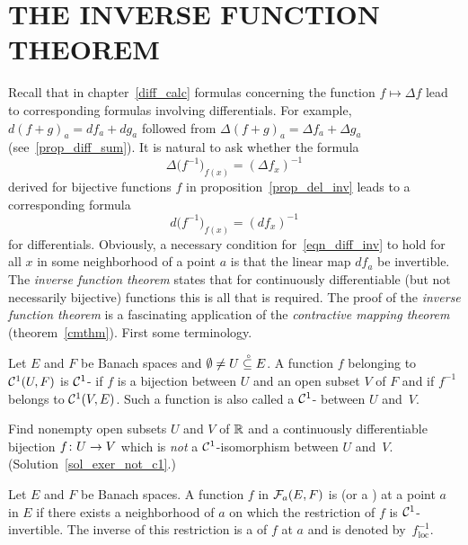 \section{THE INVERSE FUNCTION THEOREM} Recall that in chapter~\ref{diff_calc} formulas concerning
the function $f \mapsto \Delta f$ lead to corresponding formulas involving differentials. For
example, $d(f+g)_a = df_a + dg_a$ followed from $\Delta (f+g)_a = \Delta f_a + \Delta g_a$
(see~\ref{prop_diff_sum}).  It is natural to ask whether the formula
  \[ \Delta \bigl(f^{-1}\bigr)_{f(x)} = (\Delta f_x)^{-1} \]
derived for bijective functions $f$ in proposition~\ref{prop_del_inv} leads to a corresponding
formula
 \begin{equation}\label{eqn_diff_inv}
     d\bigl(f^{-1}\bigr)_{f(x)} = (df_x)^{-1}
 \end{equation}
for differentials.  Obviously, a necessary condition for~\eqref{eqn_diff_inv} to hold for all
$x$ in some neighborhood of a point $a$ is that the linear map $df_a$ be invertible.  The
\emph{inverse function theorem} states that for continuously differentiable (but not
necessarily bijective) functions this is all that is required.  The proof of the \emph{inverse
function theorem} is a fascinating application of the \emph{contractive mapping theorem}
(theorem~\ref{cmthm}).  First some terminology.

\begin{defn}  Let $E$ and $F$ be Banach spaces and $\emptyset \ne U\overset{\thickspace{}_\circ}{\subseteq}E$.  A function $f$
belonging to  $\mathcal{C}^1(U,F)$  is
$\mathcal{C}^1$- if $f$ is a bijection between $U$ and an open subset $V$ of $F$ and
if $f^{-1}$ belongs to $\mathcal{C}^1(V,E)$.  Such a function is also called a
$\mathcal{C}^1$- between $U$ and~$V$.
\end{defn}

\begin{exer}\label{exer_not_c1}  Find nonempty open subsets $U$ and $V$ of $\mathbb{R}$ and a
continuously differentiable bijection $f \colon U \rightarrow V$ which is \emph{not} a $\mathcal{C}^1$-isomorphism between $U$ and~$V$. (Solution~\ref{sol_exer_not_c1}.)
\end{exer}

\begin{defn}  Let $E$ and $F$ be Banach spaces.  A function $f$ in $\mathcal{F}_a(E,F)$ is
 (or a
) at a point $a$ in $E$ if there exists a neighborhood of $a$
on which the restriction of $f$ is $\mathcal{C}^1$-invertible.  The inverse of this restriction is
a
 of $f$ at $a$ and is denoted
by~$f_{\text{loc}}^{-1}$.
\end{defn}

